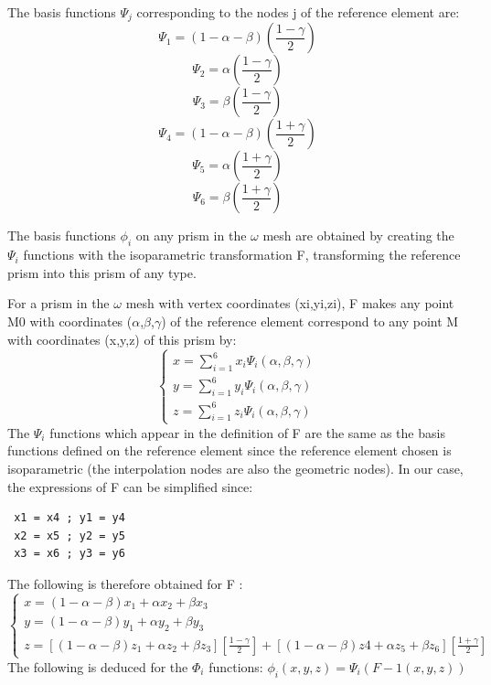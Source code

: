 The basis functions $\Psi _{j}$ corresponding to the nodes j of the reference
element are:
\[\Psi _{1} =(1-\alpha -\beta )\left(\frac{1-\gamma }{2} \right)\]
\[\Psi _{2} =\alpha \left(\frac{1-\gamma }{2} \right)\]
\[\Psi _{3} =\beta \left(\frac{1-\gamma }{2} \right)\]
\[\Psi _{4} =(1-\alpha -\beta )\left(\frac{1+\gamma }{2} \right)\]
\[\Psi _{5} =\alpha \left(\frac{1+\gamma }{2} \right)\]
\[\Psi _{6} =\beta \left(\frac{1+\gamma }{2} \right)\]

The basis functions $\phi _{i}$ on any prism in the $\omega$ mesh are obtained
by creating the $\Psi _{i}$ functions with the isoparametric transformation F,
transforming the reference prism into this prism of any type.

For a prism in the $\omega$ mesh with vertex coordinates (xi,yi,zi), F makes
any point M0 with coordinates ($\alpha$,$\beta$,$\gamma$) of the reference
element correspond to any point M with coordinates (x,y,z) of this prism by:
\[\left\{\begin{array}{c} {x=\sum _{i=1}^{6}x_{i} \Psi _{i} (\alpha ,\beta
  ,\gamma ) } \\ {y=\sum _{i=1}^{6}y_{i} \Psi _{i} (\alpha ,\beta ,\gamma ) }
  \\ {z=\sum _{i=1}^{6}z_{i} \Psi _{i} (\alpha ,\beta ,\gamma ) }
  \end{array}\right. \]
The $\Psi _{i}$ functions which appear in the definition of F are the same as
the basis functions defined on the reference element since the reference
element chosen is isoparametric (the interpolation nodes are also the geometric
nodes). In our case, the expressions of F can be simplified since:
\begin{verbatim}
 x1 = x4 ; y1 = y4
 x2 = x5 ; y2 = y5
 x3 = x6 ; y3 = y6
\end{verbatim}

The following is therefore obtained for F :
\[\left\{\begin{array}{c} {x=(1-\alpha -\beta )x_{1} +\alpha x_{2} +\beta x_{3}
  } \\ {y=(1-\alpha -\beta )y_{1} +\alpha y_{2} +\beta y_{3} } \\
  {z=\left[(1-\alpha -\beta )z_{1} +\alpha z_{2} +\beta z_{3}
  \right]\left[\frac{1-\gamma }{2} \right]+\left[(1-\alpha -\beta )z4+\alpha
  z_{5} +\beta z_{6} \right]\left[\frac{1+\gamma }{2} \right]}
  \end{array}\right. \]
  The following is deduced for the $\Phi _{i}$ functions:
  $\phi _{i} (x, y, z) =  \Psi _{i} (F-1 (x, y, z))$

